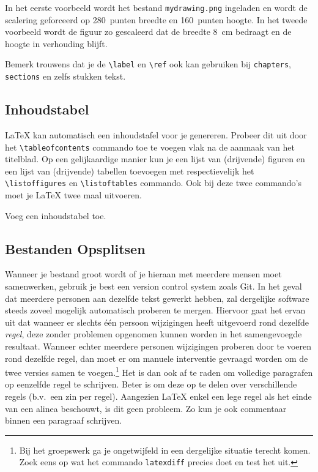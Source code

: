 \documentclass[12pt, dutch]{article}
\newcommand{\bs}{\textbackslash}
\begin{document}
In het eerste voorbeeld wordt het bestand \texttt{mydrawing.png} ingeladen en
wordt de scalering geforceerd op 280~punten breedte en 160~punten
hoogte. In het tweede voorbeeld wordt de figuur zo gescaleerd dat de
breedte 8~cm bedraagt en de hoogte in verhouding blijft.

Bemerk trouwens dat je de \texttt{\bs{}label} en \texttt{\bs{}ref} ook kan gebruiken bij
\texttt{chapters}, \texttt{sections} en zelfs stukken tekst.

\subsection{Inhoudstabel}

\LaTeX{} kan automatisch een inhoudstafel voor je genereren. Probeer
dit uit door het \texttt{\bs{}tableofcontents} commando toe
te voegen vlak na de aanmaak van het titelblad.  Op een
gelijkaardige manier kun je een lijst van (drijvende) figuren en een
lijst van (drijvende) tabellen toevoegen met respectievelijk het
\texttt{\bs{}listoffigures} en \texttt{\bs{}listoftables} commando.
Ook bij deze twee commando's moet je \LaTeX{} twee maal uitvoeren.
\begin{tcolorbox}[title=Opgave 5i]
  Voeg een inhoudstabel toe.
\end{tcolorbox}

\subsection{Bestanden Opsplitsen}
Wanneer je bestand groot wordt of je hieraan met meerdere mensen moet samenwerken,
gebruik je best een version control system zoals Git.
In het geval dat meerdere personen aan dezelfde tekst gewerkt hebben, zal dergelijke
software steeds zoveel mogelijk automatisch proberen te mergen. Hiervoor gaat het ervan uit
dat wanneer er slechts \'e\'en persoon wijzigingen heeft uitgevoerd rond dezelfde {\em regel}, deze zonder problemen
opgenomen kunnen worden in het samengevoegde resultaat. Wanneer echter meerdere personen
wijzigingen proberen door te voeren rond dezelfde regel, dan moet er om manuele interventie
gevraagd worden om de twee versies samen te voegen.\footnote{Bij het groepswerk ga je ongetwijfeld in een
  dergelijke situatie terecht komen. Zoek eens op wat het commando {\tt latexdiff} precies doet en test het uit.}
Het is dan ook af te raden om volledige paragrafen op eenzelfde
regel te schrijven. Beter is om deze op te delen over verschillende regels
(b.v.\ een zin per regel). Aangezien \LaTeX{} enkel een lege
regel als het einde van een alinea beschouwt, is dit geen probleem. Zo kun
je ook commentaar binnen een paragraaf schrijven.
\end{document}
